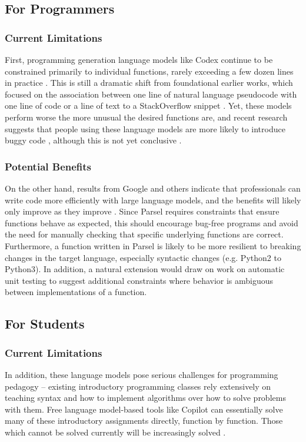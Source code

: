 \subsection{For Programmers}
\subsubsection{Current Limitations}
First, programming generation language models like Codex continue to be constrained primarily to individual functions, rarely exceeding a few dozen lines in practice \citep{chen2021evaluating,tabachnyk2022ml}. This is still a dramatic shift from foundational earlier works, which focused on the association between one line of natural language pseudocode with one line of code \citep{kulal2019spoc} or a line of text to a StackOverflow snippet \citep{yin2018learning}. Yet, these models perform worse the more unusual the desired functions are, and recent research suggests that people using these language models are more likely to introduce buggy code \citep{perry2022users}, although this is not yet conclusive \citep{sandoval2022security}.
\subsubsection{Potential Benefits}
On the other hand, results from Google and others indicate that professionals can write code more efficiently with large language models, and the benefits will likely only improve as they improve \citep{tabachnyk2022ml}. Since Parsel requires constraints that ensure functions behave as expected, this should encourage bug-free programs and avoid the need for manually checking that specific underlying functions are correct. Furthermore, a function written in Parsel is likely to be more resilient to breaking changes in the target language, especially syntactic changes (e.g. Python2 to Python3). In addition, a natural extension would draw on work on automatic unit testing \citep{daka2014survey} to suggest additional constraints where behavior is ambiguous between implementations of a function.

\subsection{For Students}
\subsubsection{Current Limitations}
In addition, these language models pose serious challenges for programming pedagogy -- existing introductory programming classes rely extensively on teaching syntax and how to implement algorithms over how to solve problems with them. Free language model-based tools like Copilot can essentially solve many of these introductory assignments directly, function by function. Those which cannot be solved currently will be increasingly solved \citep{denny2022conversing}.

